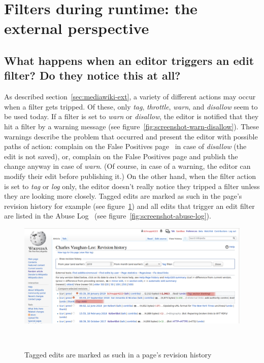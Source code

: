 \section{Filters during runtime: the external perspective}


\subsection{What happens when an editor triggers an edit filter? Do they notice this at all?}

As described section~\ref{sec:mediawiki-ext}, a variety of different actions may occur when a filter gets tripped.
Of these, only \emph{tag}, \emph{throttle}, \emph{warn}, and \emph{disallow} seem to be used today.
If a filter is set to \emph{warn} or \emph{disallow}, the editor is notified that they hit a filter by a warning message (see figure~\ref{fig:screenshot-warn-disallow}).
These warnings describe the problem that occurred and present the editor with possible paths of action:
complain on the False Positives page~\cite{Wikipedia:EditFilterFalsePositives} in case of \emph{disallow} (the edit is not saved),
or, complain on the False Positives page and publish the change anyway in case of \emph{warn}.
(Of course, in case of a warning, the editor can modify their edit before publishing it.)
On the other hand, when the filter action is set to \emph{tag} or \emph{log} only, the editor doesn't really notice they tripped a filter unless they are looking more closely.
Tagged edits are marked as such in the page's revision history for example (see figure~\ref{fig:tags-in-history})
and all edits that trigger an edit filter are listed in the Abuse Log~\cite{Wikipedia:AbuseLog} (see figure~\ref{fig:screenshot-abuse-log}).

\begin{figure}
\centering
  \includegraphics[width=0.9\columnwidth]{pics/screenshots-filter-trigger/Screenshot-tags-in-revision-history.png}
  \caption{Tagged edits are marked as such in a page's revision history}~\label{fig:tags-in-history}
\end{figure}

